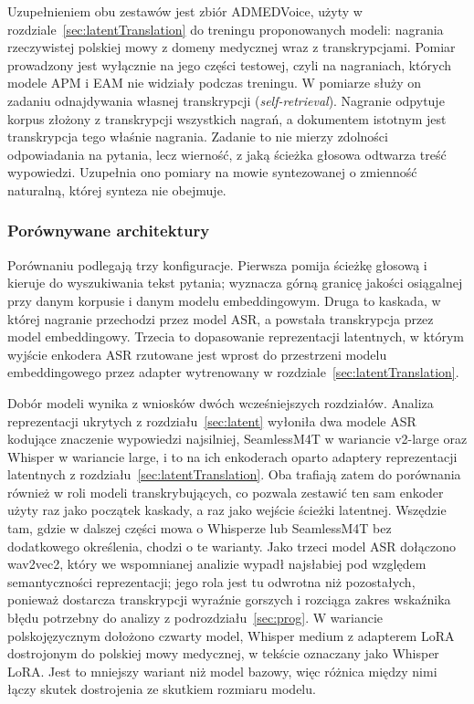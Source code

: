 Uzupełnieniem obu zestawów jest zbiór ADMEDVoice, użyty w rozdziale~\ref{sec:latentTranslation}
do treningu proponowanych modeli: nagrania rzeczywistej polskiej mowy z domeny medycznej wraz
z transkrypcjami. Pomiar prowadzony jest wyłącznie na jego części testowej, czyli na
nagraniach, których modele APM i EAM nie widziały podczas treningu. W pomiarze służy on
zadaniu odnajdywania własnej transkrypcji (\textit{self-retrieval}). Nagranie odpytuje korpus
złożony z transkrypcji wszystkich nagrań, a dokumentem istotnym jest transkrypcja tego właśnie
nagrania. Zadanie to nie mierzy zdolności odpowiadania na pytania, lecz wierność, z jaką ścieżka
głosowa odtwarza treść wypowiedzi. Uzupełnia ono pomiary na mowie syntezowanej o zmienność
naturalną, której synteza nie obejmuje.

\subsubsection{Porównywane architektury}
Porównaniu podlegają trzy konfiguracje. Pierwsza pomija ścieżkę głosową i kieruje do wyszukiwania
tekst pytania; wyznacza górną granicę jakości osiągalnej przy danym korpusie i danym modelu
embeddingowym. Druga to kaskada, w której nagranie przechodzi przez model ASR, a powstała
transkrypcja przez model embeddingowy. Trzecia to dopasowanie reprezentacji latentnych, w którym
wyjście enkodera ASR rzutowane jest wprost do przestrzeni modelu embeddingowego przez adapter
wytrenowany w rozdziale~\ref{sec:latentTranslation}.

Dobór modeli wynika z wniosków dwóch wcześniejszych rozdziałów. Analiza reprezentacji ukrytych
z rozdziału~\ref{sec:latent} wyłoniła dwa modele ASR kodujące znaczenie wypowiedzi najsilniej,
SeamlessM4T w wariancie v2-large oraz Whisper w wariancie large, i to na ich enkoderach oparto adaptery
reprezentacji latentnych z rozdziału~\ref{sec:latentTranslation}. Oba trafiają zatem do porównania
również w roli modeli transkrybujących, co pozwala zestawić ten sam enkoder użyty raz jako
początek kaskady, a raz jako wejście ścieżki latentnej. Wszędzie tam, gdzie w dalszej części
mowa o Whisperze lub SeamlessM4T bez dodatkowego określenia, chodzi o te warianty. Jako trzeci model ASR
dołączono wav2vec2, który we wspomnianej analizie wypadł najsłabiej pod względem semantyczności
reprezentacji; jego rola jest tu odwrotna niż pozostałych, ponieważ dostarcza transkrypcji
wyraźnie gorszych i rozciąga zakres wskaźnika błędu potrzebny do analizy
z podrozdziału~\ref{sec:prog}. W wariancie polskojęzycznym dołożono czwarty model, Whisper
medium z adapterem LoRA dostrojonym do polskiej mowy medycznej, w tekście oznaczany jako Whisper
LoRA. Jest to mniejszy wariant niż model bazowy, więc różnica między nimi łączy skutek
dostrojenia ze skutkiem rozmiaru modelu.


